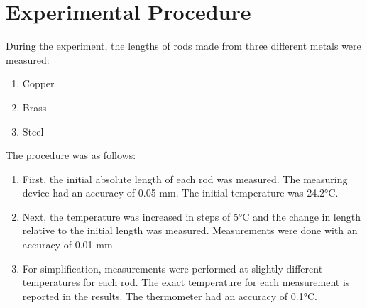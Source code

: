 \section{Experimental Procedure}

During the experiment, the lengths of rods made from three different metals were measured:
\begin{enumerate}
    \item Copper
    \item Brass
    \item Steel
\end{enumerate}

The procedure was as follows:

\begin{enumerate}
    \item First, the initial absolute length of each rod was measured. The measuring device had an accuracy of 0.05 mm. The initial temperature was 24.2°C.
    \item Next, the temperature was increased in steps of 5°C and the change in length relative to the initial length was measured. Measurements were done with an accuracy of 0.01 mm.
    \item For simplification, measurements were performed at slightly different temperatures for each rod. The exact temperature for each measurement is reported in the results. The thermometer had an accuracy of 0.1°C.
\end{enumerate}
